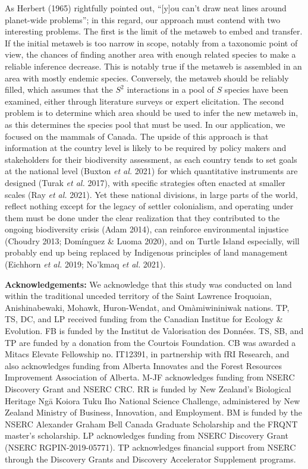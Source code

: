 \documentclass[10pt,oneside]{article}
\begin{document}
As Herbert (1965) rightfully pointed out, ``{[}y{]}ou can't draw neat
lines around planet-wide problems''; in this regard, our approach must
contend with two interesting problems. The first is the limit of the
metaweb to embed and transfer. If the initial metaweb is too narrow in
scope, notably from a taxonomic point of view, the chances of finding
another area with enough related species to make a reliable inference
decrease. This is notably true if the metaweb is assembled in an area
with mostly endemic species. Conversely, the metaweb should be reliably
filled, which assumes that the \(S^2\) interactions in a pool of \(S\)
species have been examined, either through literature surveys or expert
elicitation. The second problem is to determine which area should be
used to infer the new metaweb in, as this determines the species pool
that must be used. In our application, we focused on the mammals of
Canada. The upside of this approach is that information at the country
level is likely to be required by policy makers and stakeholders for
their biodiversity assessment, as each country tends to set goals at the
national level (Buxton \emph{et al.} 2021) for which quantitative
instruments are designed (Turak \emph{et al.} 2017), with specific
strategies often enacted at smaller scales (Ray \emph{et al.} 2021). Yet
these national divisions, in large parts of the world, reflect nothing
except for the legacy of settler colonialism, and operating under them
must be done under the clear realization that they contributed to the
ongoing biodiversity crisis (Adam 2014), can reinforce environmental
injustice (Choudry 2013; Domínguez \& Luoma 2020), and on Turtle Island
especially, will probably end up being replaced by Indigenous principles
of land management (Eichhorn \emph{et al.} 2019; No'kmaq \emph{et al.}
2021).

\textbf{Acknowledgements:} We acknowledge that this study was conducted
on land within the traditional unceded territory of the Saint Lawrence
Iroquoian, Anishinabewaki, Mohawk, Huron-Wendat, and Omàmiwininiwak
nations. TP, TS, DC, and LP received funding from the Canadian Institue
for Ecology \& Evolution. FB is funded by the Institut de Valorisation
des Données. TS, SB, and TP are funded by a donation from the Courtois
Foundation. CB was awarded a Mitacs Elevate Fellowship no. IT12391, in
partnership with fRI Research, and also acknowledges funding from
Alberta Innovates and the Forest Resources Improvement Association of
Alberta. M-JF acknowledges funding from NSERC Discovery Grant and NSERC
CRC. RR is funded by New Zealand's Biological Heritage Ngā Koiora Tuku
Iho National Science Challenge, administered by New Zealand Ministry of
Business, Innovation, and Employment. BM is funded by the NSERC
Alexander Graham Bell Canada Graduate Scholarship and the FRQNT master's
scholarship. LP acknowledges funding from NSERC Discovery Grant (NSERC
RGPIN-2019-05771). TP acknowledges financial support from NSERC through
the Discovery Grants and Discovery Accelerator Supplement programs.
\end{document}
